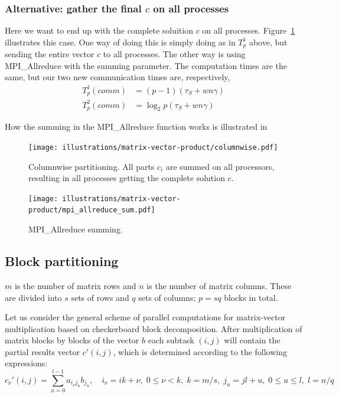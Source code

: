 \subsubsection{Alternative: gather the final $c$ on all processes} %
\label{ssub:alternative_gather_the_final_c}
Here we want to end up with the complete soluition $c$ on all processes. Figure~\ref{fig:rowwise-alt} illustrates this case. One way of doing this is simply doing as in $T_p^1$ above, but sending the entire vector $c$ to all processes. The other way is using MPI\_Allreduce with the summing parameter. The computation times are the same, but our two new communication times are, respectively,
\begin{align}
  T_p^1(comm) &= (p-1) \left( \tau_S + w n \gamma \right) \\
  T_p^2(comm)   &= \log_2 p \left( \tau_S + w n \gamma \right)
\end{align}

How the summing in the MPI\_Allreduce function works is illustrated in


\begin{figure}[htbp]
  \centering
  \texttt{[image: illustrations/matrix-vector-product/columnwise.pdf]}
  \caption{Columnwise partitioning. All parts $c_i$ are summed on all processors, resulting in all processes getting the complete solution $c$.}
  \label{fig:rowwise-alt}
\end{figure}

\begin{figure}[htbp]
  \centering
  \texttt{[image: illustrations/matrix-vector-product/mpi\_allreduce\_sum.pdf]}
  \caption{MPI\_Allreduce summing.}
  \label{fig:mpi_reduce}
\end{figure}



\subsection{Block partitioning} %
\label{sub:block_partitioning}
$m$ is the number of matrix rows and $n$ is the number of matrix columns. These are divided into $s$ sets of rows and $q$ sets of columns; $p=sq$ blocks in total.

Let us consider the general scheme of parallel computations for matrix-vector multiplication based on checkerboard block decomposition. After multiplication of matrix blocks by blocks of the vector $b$ each subtask $(i,j)$ will contain the partial results vector $c'(i,j)$, which is determined according to the following expressions:
\begin{equation}
  c_\nu'(i,j) = \sum_{u=0}^{l-1} a_{i_\nu j_{u}} b_{j_u}, \quad i_\nu = ik+\nu, \; 0\leq \nu < k, \; k = m/s, \; j_u = jl+u, \; 0 \leq u \leq l, \; l = n/q
\end{equation}

